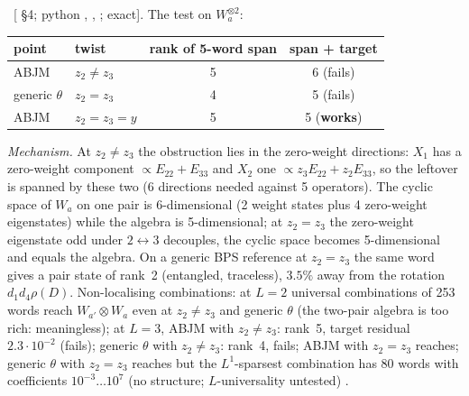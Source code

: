 \ex\ [ \S4; python , , ; exact]. The test on $W_a^{\otimes2}$:
\begin{center}
\begin{tabular}{llcc}
\toprule
point & twist & rank of 5-word span & span + target\\
\midrule
ABJM & $z_2\ne z_3$ & 5 & 6 (fails)\\
generic $\theta$ & $z_2=z_3$ & 4 & 5 (fails)\\
ABJM & $z_2=z_3=y$ & 5 & 5 (\textbf{works})\\
\bottomrule
\end{tabular}
\end{center}
\emph{Mechanism.} At $z_2\ne z_3$ the obstruction lies in the zero-weight directions: $X_1$ has a zero-weight component $\propto E_{22}+E_{33}$ and $X_2$ one $\propto z_3E_{22}+z_2E_{33}$, so the leftover is spanned by these two
(6 directions needed against 5 operators). The cyclic space of $W_a$ on one pair is 6-dimensional (2 weight states plus 4 zero-weight eigenstates) while the algebra is 5-dimensional; at $z_2=z_3$ the zero-weight eigenstate odd under $2\leftrightarrow3$ decouples, the cyclic space becomes 5-dimensional and equals the algebra.
On a generic BPS reference at $z_2=z_3$ the same word gives a pair state of rank~2 (entangled, traceless), $3.5\%$ away from the rotation $d_1d_4\rho(D)$.
Non-localising combinations: at $L=2$ universal combinations of 253 words reach $W_{a'}\otimes W_a$ even at $z_2\ne z_3$ and generic $\theta$ (the two-pair algebra is too rich: meaningless); at $L=3$, ABJM with $z_2\ne z_3$: rank~5, target residual $2.3\cdot10^{-2}$ (fails);
generic $\theta$ with $z_2\ne z_3$: rank~4, fails; ABJM with $z_2=z_3$ reaches; generic $\theta$ with $z_2=z_3$ reaches but the $L^1$-sparsest combination has 80 words with coefficients $10^{-3}\ldots10^{7}$ (no structure; $L$-universality untested) \npy.

